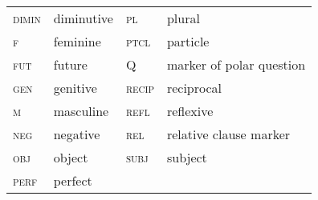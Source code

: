 \documentclass[output=collectionpaper]{langsci/langscibook}
\begin{document}
\begin{tabular}{llll}
 \textsc{dimin} & diminutive& \textsc{pl} & plural\\
 \textsc{f} & feminine &  \textsc{ptcl} & particle\\
 \textsc{fut} & future&  Q & marker of polar question\\
 \textsc{gen} & genitive&  \textsc{recip} & reciprocal\\
 \textsc{m} & masculine&  \textsc{refl} & reflexive\\
 \textsc{neg} & negative&  \textsc{rel} & relative clause marker\\
 \textsc{obj} & object & \textsc{subj} & subject\\
 \textsc{perf} & perfect\\
\end{tabular}

\printbibliography[heading=subbibliography,notkeyword=this]


\label{lastpage:Dryer}
\end{document}
